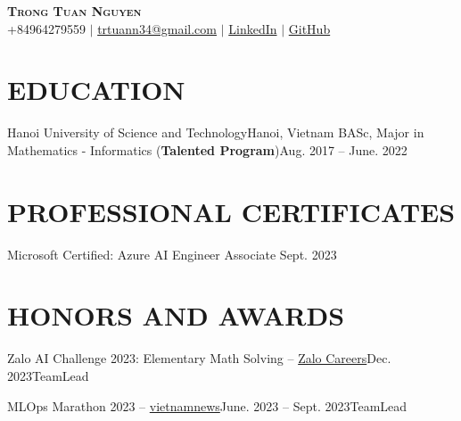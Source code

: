 \documentclass[letterpaper,11pt]{article}
\begin{document}
\begin{center}
    \textbf{\Huge \scshape Trong Tuan Nguyen} \\ \vspace{1pt}
    {\color{Blue} +84964279559} $|$
    \href{mailto:trtuann34@gmail.com}{\color{Blue}trtuann34@gmail.com} $|$
    \href{https://www.linkedin.com/in/santapo/}{\color{Blue}LinkedIn} $|$
    \href{https://github.com/santapo}{\color{Blue}GitHub}
\end{center}

\section{EDUCATION}
  \resumeSubHeadingListStart
    \resumeSubheading
      {Hanoi University of Science and Technology}{Hanoi, Vietnam}
      {BASc, Major in Mathematics - Informatics (\textbf{Talented Program})}{Aug. 2017 -- June. 2022}
  \resumeSubHeadingListEnd

\section{PROFESSIONAL CERTIFICATES}
\resumeSubHeadingListStart
    \resumeSubheading
      {Microsoft Certified: Azure AI Engineer Associate}{}
      {Sept. 2023}{}
\resumeSubHeadingListEnd


\section{HONORS AND AWARDS}
\resumeSubHeadingListStart

      \resumeSubheading
        {Zalo AI Challenge 2023: Elementary Math Solving -- \textmd{\href{https://web.facebook.com/share/p/16pKFajqJx/}{\color{blue} Zalo Careers}}}{Dec. 2023}{TeamLead}{}
        \resumeItemListStart
      \resumeItemListEnd

      \resumeSubheading
        {MLOps Marathon 2023 -- \textmd{\href{https://vietnamnews.vn/opinion/1593730/developing-machine-learning-operations-key-to-vn-to-reach-the-world-s-tech-level.html}{\color{blue} vietnamnews}}}{June. 2023 -- Sept. 2023}{TeamLead}{}
        \resumeItemListStart
      \resumeItemListEnd
\end{document}
